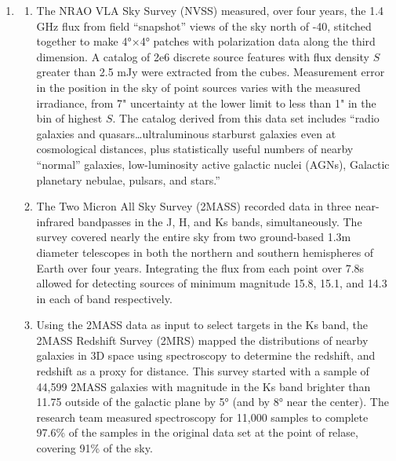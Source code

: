 \documentclass{paper}
\begin{document}
\begin{enumerate}
  \pagebreak \item %
    \begin{enumerate}
      \item
        The NRAO VLA Sky Survey (NVSS) measured, over four years, the 1.4 
        GHz flux from field ``snapshot'' views of the sky north of -40, 
        stitched together to make 4°×4° patches with polarization data along 
        the third dimension. A catalog of 2e6 discrete source features with 
        flux density $S$ greater than 2.5 mJy were extracted from the cubes. 
        Measurement error in the position in the sky of point sources varies 
        with the measured irradiance, from 7" uncertainty at the lower limit 
        to less than 1" in the bin of highest $S$. The catalog derived from
        this data set includes ``radio galaxies and quasars\ldots ultraluminous 
        starburst galaxies even at cosmological distances, plus statistically 
        useful numbers of nearby ``normal'' galaxies, low-luminosity 
        active galactic nuclei (AGNs), Galactic planetary nebulae, pulsars, 
        and stars.''\cite{Condon_1998}

      \item
        The Two Micron All Sky Survey (2MASS) recorded data in three 
        near-infrared bandpasses in the J, H, and Ks bands, simultaneously. 
        The survey covered nearly the entire sky from two ground-based 1.3m 
        diameter telescopes in both the northern and southern hemispheres of
        Earth over four years. Integrating the flux from each point over 7.8s 
        allowed for detecting sources of minimum magnitude 15.8, 15.1, and 
        14.3 in each of band respectively.\cite{Skrutskie_2006}

      \item
        Using the 2MASS data as input to select targets in the Ks band, the
        2MASS Redshift Survey (2MRS) mapped the distributions of nearby
        galaxies in 3D space using spectroscopy to determine the redshift, 
        and redshift as a proxy for distance. This survey started with a 
        sample of 44,599 2MASS galaxies with magnitude in the Ks band  
        brighter than 11.75 outside of the galactic plane by 5° (and by 8°
        near the center). The research team measured spectroscopy for 11,000
        samples to complete 97.6\% of the samples in the original data set at 
        the point of relase, covering 91\% of the sky.\cite{Huchra_2012}

    \end{enumerate}


\end{enumerate}
\end{document}
